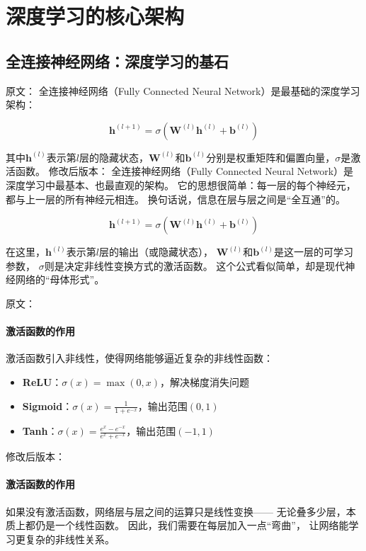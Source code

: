 \section{深度学习的核心架构}

\subsection{全连接神经网络：深度学习的基石}

原文：
全连接神经网络（Fully Connected Neural Network）是最基础的深度学习架构：

$$\mathbf{h}^{(l+1)} = \sigma(\mathbf{W}^{(l)} \mathbf{h}^{(l)} + \mathbf{b}^{(l)})$$

其中$\mathbf{h}^{(l)}$表示第$l$层的隐藏状态，$\mathbf{W}^{(l)}$和$\mathbf{b}^{(l)}$分别是权重矩阵和偏置向量，$\sigma$是激活函数。
修改后版本：
全连接神经网络（Fully Connected Neural Network）是深度学习中最基本、也最直观的架构。  
它的思想很简单：每一层的每个神经元，都与上一层的所有神经元相连。  
换句话说，信息在层与层之间是“全互通”的。

$$\mathbf{h}^{(l+1)} = \sigma(\mathbf{W}^{(l)} \mathbf{h}^{(l)} + \mathbf{b}^{(l)})$$

在这里，$\mathbf{h}^{(l)}$表示第$l$层的输出（或隐藏状态），  
$\mathbf{W}^{(l)}$和$\mathbf{b}^{(l)}$是这一层的可学习参数，  
$\sigma$则是决定非线性变换方式的激活函数。  
这个公式看似简单，却是现代神经网络的“母体形式”。



原文：
\paragraph{激活函数的作用}
激活函数引入非线性，使得网络能够逼近复杂的非线性函数：

\begin{itemize}
\item \textbf{ReLU}：$\sigma(x) = \max(0, x)$，解决梯度消失问题
\item \textbf{Sigmoid}：$\sigma(x) = \frac{1}{1+e^{-x}}$，输出范围$(0,1)$
\item \textbf{Tanh}：$\sigma(x) = \frac{e^x - e^{-x}}{e^x + e^{-x}}$，输出范围$(-1,1)$
\end{itemize}
修改后版本：
\paragraph{激活函数的作用}  
如果没有激活函数，网络层与层之间的运算只是线性变换——  
无论叠多少层，本质上都仍是一个线性函数。  
因此，我们需要在每层加入一点“弯曲”，  
让网络能学习更复杂的非线性关系。  

